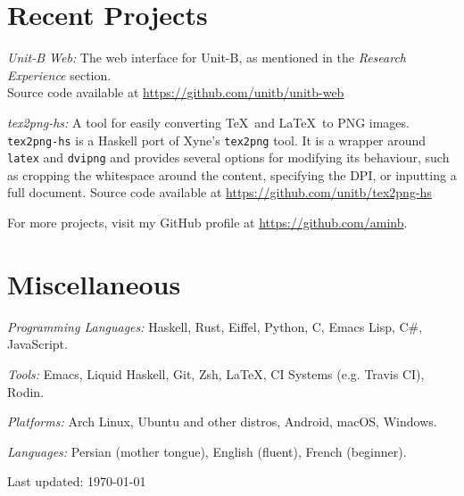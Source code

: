 \documentclass[12pt,letterpaper]{article}
\renewenvironment{itemize}{
  \begin{list}{}{
    \setlength{\leftmargin}{1.5em}
    \setlength{\itemsep}{0.25em}
    \setlength{\parskip}{0pt}
    \setlength{\parsep}{0.25em}
  }
}{
  \end{list}
}
\begin{document}
\section*{Recent Projects}

\begin{itemize}
\item \textit{Unit-B Web:} The web interface for Unit-B, as mentioned in the
  \textit{Research Experience} section.\\
  Source code available at
  \href{https://github.com/unitb/unitb-web}{https://github.com/unitb/unitb-web}

\item \textit{tex2png-hs:} A tool for easily converting \TeX\ and \LaTeX\ to
  \textsc{PNG} images. \texttt{tex2png-hs} is a Haskell port of Xyne's
  \texttt{tex2png} tool. It is a wrapper around \texttt{latex} and
  \texttt{dvipng} and provides several options for modifying its behaviour, such
  as cropping the whitespace around the content, specifying the \textsc{DPI}, or
  inputting a full document.
  Source code available at
  \href{https://github.com/unitb/tex2png-hs}{https://github.com/unitb/tex2png-hs}

\item For more projects, visit my GitHub profile at
  \href{https://github.com/aminb}{https://github.com/aminb}.
\end{itemize}

\section*{Miscellaneous}

\begin{itemize}
\item \textit{Programming Languages:} Haskell, Rust, Eiffel, Python, C, Emacs
  Lisp, C\#, JavaScript.
\item \textit{Tools:} Emacs, Liquid Haskell, Git, Zsh, \LaTeX, CI Systems
  (e.g. Travis CI), Rodin.
\item \textit{Platforms:} Arch Linux, Ubuntu and other distros, Android, macOS,
  Windows.
\item \textit{Languages:} Persian (mother tongue), English (fluent), French
  (beginner).
\end{itemize}


\bigskip
{\small Last updated: \today}
\end{document}
